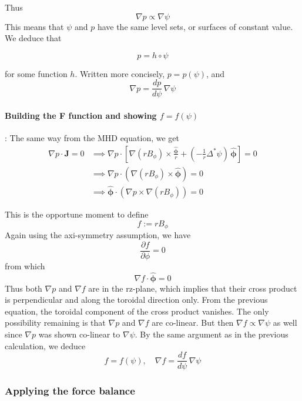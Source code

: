 \documentclass[11pt,a4paper]{article}
\begin{document}
    Thus
    $$\nabla p \propto \nabla \psi$$ 
    This means that $\psi$ and $p$ have the same level sets, or surfaces of constant value. We deduce that 

    $$p=h \circ\psi$$

    for some function $h$. Written more concisely, $p=p(\psi)$, and 
    $$\nabla p = \frac{d p}{d\psi}\,\nabla\psi$$

    \paragraph{Building the F function and showing $f=f(\psi)$}: The same way from the MHD equation, we get 
    $$\begin{aligned}
        \nabla p\cdot\mathbf{J}=0 &\implies \nabla p \cdot \left[\nabla(rB_\phi)\times\frac{\hat{\boldsymbol{\phi}}}{r}+ \left(-\frac{1}{r}\Delta^*\psi\right)\,\hat{\boldsymbol{\phi}}\right] =0 \\
        &\implies \nabla p \cdot \left(\nabla(rB_\phi) \times \hat{\boldsymbol{\phi}}\right) =0 \\
        &\implies \hat{\boldsymbol{\phi}} \cdot \left(\nabla p \times \nabla(rB_\phi)\right)=0
    \end{aligned} $$

    This is the opportune moment to define 
    $$ f := rB_\phi$$
    Again using the axi-symmetry assumption, we have 
    $$\frac{\partial f}{\partial \phi}=0$$
    from which 
    $$\nabla f \cdot \boldsymbol{\hat{\phi}}=0$$
    Thus both $\nabla p $ and $\nabla f$ are in the rz-plane, which implies that their cross product is perpendicular and along the toroidal direction only. From the previous equation, the toroidal component of the cross product vanishes. The only possibility remaining is that $\nabla p$ and $\nabla f$ are co-linear. But then $\nabla f \propto \nabla \psi$ as well since $\nabla p$ was shown co-linear to $\nabla \psi$. By the same argument as in the previous calculation, we deduce 
    $$f = f(\psi), \quad \nabla f=\frac{d f}{d\psi}\,\nabla\psi$$

    \subsubsection{Applying the force balance}
\end{document}
